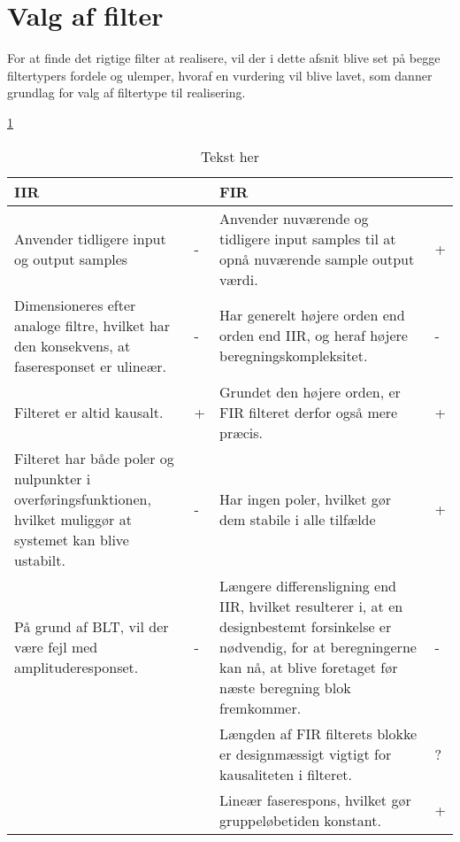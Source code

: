 \section{Valg af filter}\label{sec:dec_filter}
For at finde det rigtige filter at realisere, vil der i dette afsnit blive set på begge filtertypers fordele og ulemper, hvoraf en vurdering vil blive lavet, som danner grundlag for valg af filtertype til realisering.


\ref{tab:fir_iir_}


\begin{table}[h!]
	\centering
	\caption{Tekst her}
	\label{tab:fir_iir_}
\begin{tabular}{l l l l}
	\toprule
	IIR &  &FIR & \\
	\midrule 
	Anvender tidligere input og output samples & - & Anvender nuværende og tidligere input samples til at opnå nuværende sample output værdi. & + \\
	Dimensioneres efter analoge filtre, hvilket har den konsekvens, at faseresponset er ulineær. & - & Har generelt højere orden end orden end IIR, og heraf højere beregningskompleksitet. & - \\
	Filteret er altid kausalt. & + & Grundet den højere orden, er FIR filteret derfor også mere præcis. & + \\	
	Filteret har både poler og nulpunkter i overføringsfunktionen, hvilket muliggør at systemet kan blive ustabilt. & - & Har ingen poler, hvilket gør dem stabile i alle tilfælde & + \\
	På grund af BLT, vil der være fejl med amplituderesponset. & - & Længere differensligning end IIR, hvilket resulterer i, at en designbestemt forsinkelse er nødvendig, for at beregningerne kan nå, at blive foretaget før næste beregning blok fremkommer. & - \\
	& & Længden af FIR filterets blokke er designmæssigt vigtigt for kausaliteten i filteret. & ? \\
	& & Lineær faserespons, hvilket gør gruppeløbetiden konstant. & + \\
	\bottomrule
\end{tabular}
\end{table}
